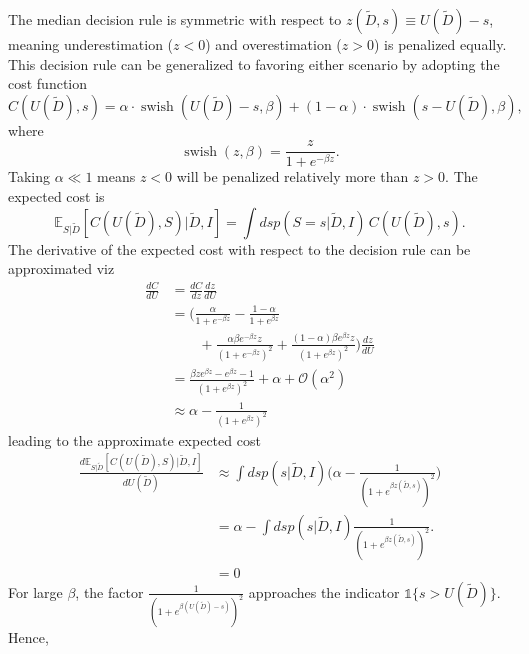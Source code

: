 \begin{example}
	The median decision rule is symmetric with respect to $z(\tilde{D},s) \equiv U(\tilde{D})-s$, meaning underestimation ($z<0$) and overestimation ($z>0$) is penalized equally. This decision rule can be generalized to favoring either scenario by adopting the cost function
	\begin{equation}
		C(U(\tilde{D}), s) = \alpha\cdot \operatorname{swish}(U(\tilde{D})-s,\beta)
		+(1-\alpha)\cdot \operatorname{swish}(s-U(\tilde{D}),\beta),
	\end{equation}
	where
	\begin{equation}
		\operatorname{swish}(z,\beta) = \frac{z}{1+e^{-\beta z}}.
	\end{equation}
	Taking $\alpha \ll 1$ means $z<0$ will be penalized relatively more than $z>0$. The expected cost is
	\begin{equation}
		\mathbb{E}_{S|\tilde{D}}[C(U(\tilde{D}), S)|\tilde{D},I] = \int ds  p(S=s|\tilde{D},I)\, C(U(\tilde{D}),s).
	\end{equation}
	The derivative of the expected cost with respect to the decision rule can be approximated viz
	\begin{equation}
		\begin{split}
			\frac{dC}{dU} & = \frac{dC}{dz}\frac{dz}{dU}\\
			& = \bigg(\frac{\alpha}{1+e^{-\beta z}}-\frac{1-\alpha}{1+e^{\beta z}}\\
			&\qquad+\frac{\alpha\beta e^{-\beta z}z}{(1+e^{-\beta z})^2}+\frac{(1-\alpha)\beta e^{\beta z}z}{(1+e^{\beta z})^2}\bigg)\frac{dz}{dU}\\
			&= \frac{\beta z e^{\beta z}-e^{\beta z}-1}{(1+e^{\beta z})^2}+\alpha+\mathcal{O}(\alpha^2)\\
			&\approx  \alpha -\frac{1}{(1+e^{\beta z})^2}
		\end{split}
	\end{equation}
	leading to the approximate expected cost
	\begin{equation}
		\begin{split}
			\frac{d\mathbb{E}_{S|\tilde{D}}[C(U(\tilde{D}), S)|\tilde{D},I]}{dU(\tilde{D})} &\approx \int ds p(s|\tilde{D},I) \bigg(\alpha -\frac{1}{(1+e^{\beta z(\tilde{D},s)})^2}\bigg)\\
			& = \alpha -\int ds p(s|\tilde{D},I)\frac{1}{(1+e^{\beta z(\tilde{D},s)})^2}.\\
			& = 0
		\end{split}
	\end{equation}
	For large $\beta$, the factor $\frac{1}{(1+e^{\beta (U(\tilde{D})-s)})^2}$ approaches the indicator $\mathbb{1}\{s>U(\tilde{D})\}$. Hence,

\end{example}
